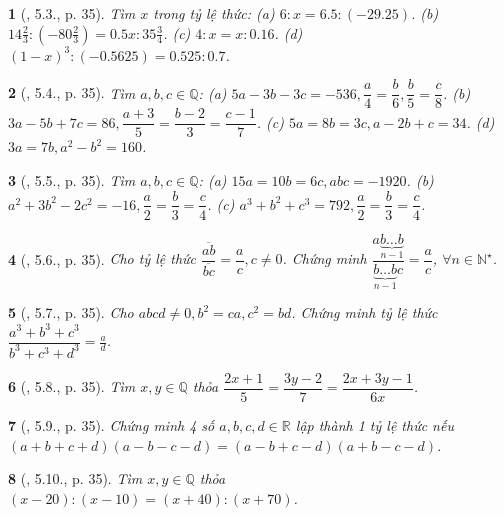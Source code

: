 \documentclass{article}
\newtheorem{baitoan}{}
\begin{document}
\begin{baitoan}[\cite{Binh_boi_duong_Toan_7_tap_1}, 5.3., p. 35]
	Tìm $x$ trong tỷ lệ thức: (a) $6:x = 6.5:(-29.25)$. (b) $14\frac{2}{3}:\left(-80\frac{2}{3}\right) = 0.5x:35\frac{3}{4}$. (c) $4:x = x:0.16$. (d) $(1 - x)^3:(-0.5625) = 0.525:0.7$.
\end{baitoan}

\begin{baitoan}[\cite{Binh_boi_duong_Toan_7_tap_1}, 5.4., p. 35]
	Tìm $a,b,c\in\mathbb{Q}$: (a) $5a - 3b - 3c = -536,\dfrac{a}{4} = \dfrac{b}{6},\dfrac{b}{5} = \dfrac{c}{8}$. (b) $3a - 5b + 7c = 86,\dfrac{a + 3}{5} = \dfrac{b - 2}{3} = \dfrac{c - 1}{7}$. (c) $5a = 8b = 3c,a - 2b + c = 34$. (d) $3a = 7b,a^2 - b^2 = 160$.
\end{baitoan}

\begin{baitoan}[\cite{Binh_boi_duong_Toan_7_tap_1}, 5.5., p. 35]
	Tìm $a,b,c\in\mathbb{Q}$: (a) $15a = 10b = 6c,abc = -1920$. (b) $a^2 + 3b^2 - 2c^2 = -16,\dfrac{a}{2} = \dfrac{b}{3} = \dfrac{c}{4}$. (c) $a^3 + b^2 + c^3 = 792,\dfrac{a}{2} = \dfrac{b}{3} = \dfrac{c}{4}$.
\end{baitoan}

\begin{baitoan}[\cite{Binh_boi_duong_Toan_7_tap_1}, 5.6., p. 35]
	Cho tỷ lệ thức $\dfrac{\overline{ab}}{\overline{bc}} = \dfrac{a}{c},c\ne0$. Chứng minh $\dfrac{a\underbrace{b\ldots b}_{n-1}}{\underbrace{b\ldots b}_{n-1}c} = \dfrac{a}{c}$, $\forall n\in\mathbb{N}^\star$.
\end{baitoan}

\begin{baitoan}[\cite{Binh_boi_duong_Toan_7_tap_1}, 5.7., p. 35]
	Cho $abcd\ne0,b^2 = ca,c^2 = bd$. Chứng minh tỷ lệ thức $\dfrac{a^3 + b^3 + c^3}{b^3 + c^3 + d^3} = \frac{a}{d}$.
\end{baitoan}

\begin{baitoan}[\cite{Binh_boi_duong_Toan_7_tap_1}, 5.8., p. 35]
	Tìm $x,y\in\mathbb{Q}$ thỏa $\dfrac{2x + 1}{5} = \dfrac{3y - 2}{7} = \dfrac{2x + 3y - 1}{6x}$.
\end{baitoan}

\begin{baitoan}[\cite{Binh_boi_duong_Toan_7_tap_1}, 5.9., p. 35]
	Chứng minh 4 số $a,b,c,d\in\mathbb{R}$ lập thành 1 tỷ lệ thức nếu $(a + b + c + d)(a - b - c - d) = (a - b + c - d)(a + b - c - d)$.
\end{baitoan}

\begin{baitoan}[\cite{Binh_boi_duong_Toan_7_tap_1}, 5.10., p. 35]
	Tìm $x,y\in\mathbb{Q}$ thỏa $(x - 20):(x - 10) = (x + 40):(x + 70)$.
\end{baitoan}
\end{document}
